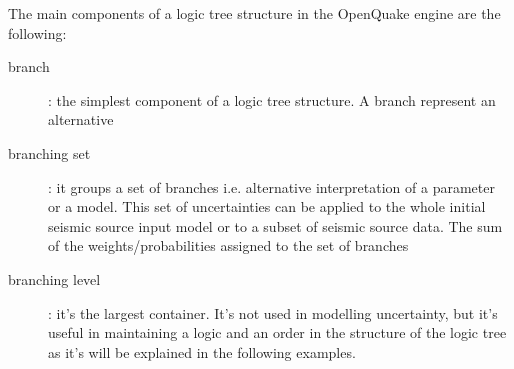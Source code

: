 The main components of a logic tree structure in the OpenQuake engine are 
the following:
\begin{description}
    \item[branch]: the simplest component of a logic tree structure. 
    A branch represent an alternative 
    \item[branching set]: it groups a set of branches i.e. 
    alternative interpretation of a parameter or a model. This set of 
    uncertainties can be applied to the whole initial seismic source input 
    model or to a subset of seismic source data. The sum of the 
    weights/probabilities assigned to the set of branches 
    \item[branching level]: it's the largest container. It's not used in 
    modelling uncertainty, but it's useful in maintaining a logic and an 
    order in the structure of the logic tree as it's will be explained in 
    the following examples.
\end{description}
